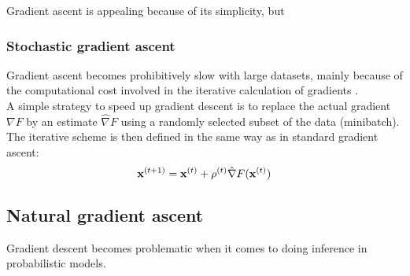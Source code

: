 Gradient ascent is appealing because of its simplicity, but 




\subsubsection{Stochastic gradient ascent} \label{section:stochastic_gradient_ascent}

Gradient ascent becomes prohibitively slow with large datasets, mainly because of the computational cost involved in the iterative calculation of gradients \cite{Spall2003}.\\
A simple strategy to speed up gradient descent is to replace the actual gradient $\nabla F$ by an estimate $\hat{\nabla} F$ using a randomly selected subset of the data (minibatch).
The iterative scheme is then defined in the same way as in standard gradient ascent:
\begin{equation}
	{\bf x}^{(t+1)} = {\bf x}^{(t)} + \rho^{(t)} \hat{\nabla} F({\bf x}^{(t)})
\end{equation}


\subsection{Natural gradient ascent} \label{section:natural_gradient_ascent}

Gradient descent becomes problematic when it comes to doing inference in probabilistic models. 


